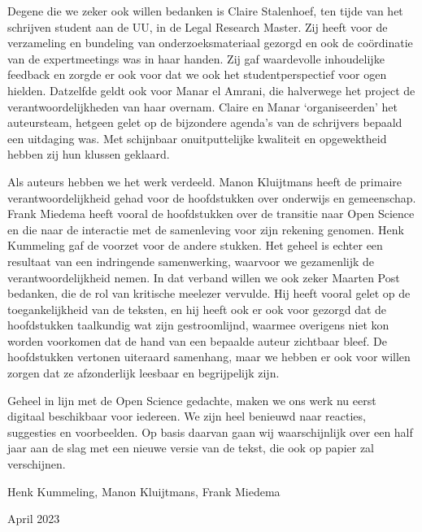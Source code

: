 \documentclass{jote-book}
\begin{document}
	Degene die we zeker ook willen bedanken is Claire Stalenhoef, ten tijde van het schrijven student aan de UU, in de Legal Research Master. Zij heeft voor de verzameling en bundeling van onderzoeksmateriaal gezorgd en ook de coördinatie van de expertmeetings was in haar handen. Zij gaf waardevolle inhoudelijke feedback en zorgde er ook voor dat we ook het studentperspectief voor ogen hielden. Datzelfde geldt ook voor Manar el Amrani, die halverwege het project de verantwoordelijkheden van haar overnam. Claire en Manar ‘organiseerden' het auteursteam, hetgeen gelet op de bijzondere agenda's van de schrijvers bepaald een uitdaging was. Met schijnbaar onuitputtelijke kwaliteit en opgewektheid hebben zij hun klussen geklaard.



	Als auteurs hebben we het werk verdeeld. Manon Kluijtmans heeft de primaire verantwoordelijkheid gehad voor de hoofdstukken over onderwijs en gemeenschap. Frank Miedema heeft vooral de hoofdstukken over de transitie naar Open Science en die naar de interactie met de samenleving voor zijn rekening genomen. Henk Kummeling gaf de voorzet voor de andere stukken. Het geheel is echter een resultaat van een indringende samenwerking, waarvoor we gezamenlijk de verantwoordelijkheid nemen. In dat verband willen we ook zeker Maarten Post bedanken, die de rol van kritische meelezer vervulde. Hij heeft vooral gelet op de toegankelijkheid van de teksten, en hij heeft ook er ook voor gezorgd dat de hoofdstukken taalkundig wat zijn gestroomlijnd, waarmee overigens niet kon worden voorkomen dat de hand van een bepaalde auteur zichtbaar bleef. De hoofdstukken vertonen uiteraard samenhang, maar we hebben er ook voor willen zorgen dat ze afzonderlijk leesbaar en begrijpelijk zijn.



	Geheel in lijn met de Open Science gedachte, maken we ons werk nu eerst digitaal beschikbaar voor iedereen. We zijn heel benieuwd naar reacties, suggesties en voorbeelden. Op basis daarvan gaan wij waarschijnlijk over een half jaar aan de slag met een nieuwe versie van de tekst, die ook op papier zal verschijnen.







	Henk Kummeling, Manon Kluijtmans, Frank Miedema



	April 2023
\end{document}

